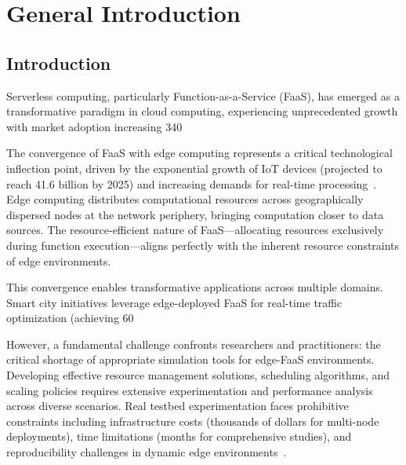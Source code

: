 \chapter{General Introduction}

\section{Introduction}

Serverless computing, particularly Function-as-a-Service (FaaS), has emerged as a transformative paradigm in cloud computing, experiencing unprecedented growth with market adoption increasing 340%

The convergence of FaaS with edge computing represents a critical technological inflection point, driven by the exponential growth of IoT devices (projected to reach 41.6 billion by 2025) and increasing demands for real-time processing~\cite{aslanpour2021serverless}. Edge computing distributes computational resources across geographically dispersed nodes at the network periphery, bringing computation closer to data sources. The resource-efficient nature of FaaS—allocating resources exclusively during function execution—aligns perfectly with the inherent resource constraints of edge environments.

This convergence enables transformative applications across multiple domains. Smart city initiatives leverage edge-deployed FaaS for real-time traffic optimization (achieving 60%

However, a fundamental challenge confronts researchers and practitioners: the critical shortage of appropriate simulation tools for edge-FaaS environments. Developing effective resource management solutions, scheduling algorithms, and scaling policies requires extensive experimentation and performance analysis across diverse scenarios. Real testbed experimentation faces prohibitive constraints including infrastructure costs (thousands of dollars for multi-node deployments), time limitations (months for comprehensive studies), and reproducibility challenges in dynamic edge environments~\cite{mampage2021cloudsimsc}.

